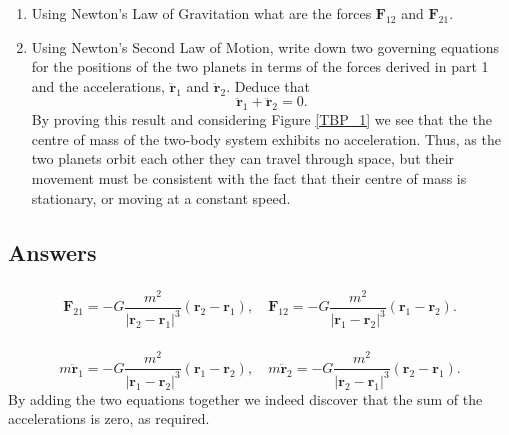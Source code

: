 \documentclass[]{article}
\newcounter{ItemCounter}
\newcommand{\bb}{\begin{equation}}
\newcommand{\ee}{\end{equation}}
\newcommand{\fig}[1]{Figure \ref{#1}}
\renewcommand{\l}{\left(}
\renewcommand{\r}{\right)}
\begin{document}
\begin{enumerate}
\item Using Newton's Law of Gravitation what are the forces $\bm{F}_{12}$ and $\bm{F}_{21}$.
\item \label{Planet_N2L}Using Newton's Second Law of Motion, write down two governing equations for the positions of the two planets in terms of the forces derived in part 1 and the accelerations, $\ddot{\bm{r}}_1$ and $\ddot{\bm{r}}_2$. Deduce that
\bb
\ddot{\bm{r}}_1+\ddot{\bm{r}}_2=0.
\ee
By proving this result and considering \fig{TBP_1} we see that the the  centre  of  mass  of  the  two-body  system  exhibits  no acceleration. Thus, as the two planets orbit each other they can travel through space, but their movement must be consistent with the fact that their centre of mass is stationary, or moving at a constant speed.
\setcounter{ItemCounter}{\value{enumi}}
\end{enumerate}


%
%
%
%
%
\begin{Answ}
\subsection{Answers}
\subsubsection{}
\bb
\bm{F}_{21}=-G\frac{m^2}{|\bm{r}_2-\bm{r}_1 |^3}\l \bm{r}_2-\bm{r}_1\r,\quad \bm{F}_{12}=-G\frac{m^2}{|\bm{r}_1-\bm{r}_2 |^3}\l \bm{r}_1-\bm{r}_2\r.
\ee
\subsubsection{}
\bb
m\ddot{\bm{r}}_1=-G\frac{m^2}{|\bm{r}_1-\bm{r}_2 |^3}\l \bm{r}_1-\bm{r}_2\r,\quad m\ddot{\bm{r}}_2=-G\frac{m^2}{|\bm{r}_2-\bm{r}_1 |^3}\l \bm{r}_2-\bm{r}_1\r.
\ee
By adding the two equations together we indeed discover that the sum of the accelerations is zero, as required.
\end{Answ}
\end{document}
